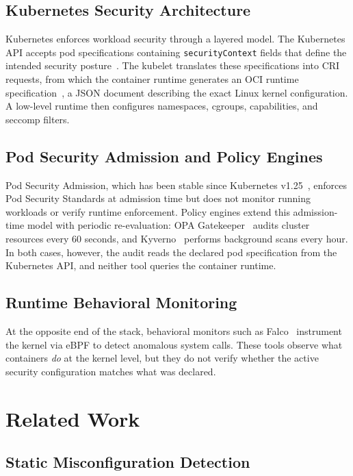 \documentclass[sigconf]{acmart}
\begin{document}
\subsection{Kubernetes Security Architecture}

Kubernetes enforces workload security through a layered model. The Kubernetes API accepts pod specifications containing \texttt{securityContext} fields that define the intended security posture~\cite{k8sseccomp2024}. The kubelet translates these specifications into CRI requests, from which the container runtime generates an OCI runtime specification~\cite{ocispec2023}, a JSON document describing the exact Linux kernel configuration. A low-level runtime then configures namespaces, cgroups, capabilities, and seccomp filters.

\subsection{Pod Security Admission and Policy Engines}

Pod Security Admission, which has been stable since Kubernetes v1.25~\cite{k8spsa2022}, enforces Pod Security Standards at admission time but does not monitor running workloads or verify runtime enforcement. Policy engines extend this admission-time model with periodic re-evaluation: OPA Gatekeeper~\cite{gatekeeper2024} audits cluster resources every 60 seconds, and Kyverno~\cite{kyverno2024} performs background scans every hour. In both cases, however, the audit reads the declared pod specification from the Kubernetes API, and neither tool queries the container runtime.

\subsection{Runtime Behavioral Monitoring}

At the opposite end of the stack, behavioral monitors such as Falco~\cite{falco2024} instrument the kernel via eBPF to detect anomalous system calls. These tools observe what containers \emph{do} at the kernel level, but they do not verify whether the active security configuration matches what was declared.

\section{Related Work}

\subsection{Static Misconfiguration Detection}
\end{document}
